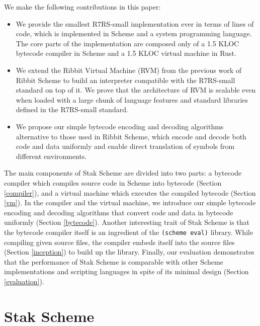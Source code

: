 \documentclass[sigplan, anonymous, review]{acmart}
\begin{document}
We make the following contributions in this paper:

\begin{itemize}
  \item We provide the smallest R7RS-small implementation ever in
    terms of lines of code, which is implemented
    in Scheme and a system programming language.
    The core parts of the implementation are composed only of a 1.5
    KLOC bytecode
    compiler in Scheme and a 1.5 KLOC virtual machine in Rust.
  \item We extend the Ribbit Virtual Machine (RVM) from the previous
    work of Ribbit Scheme to build an interpreter compatible with the
    R7RS-small standard on top of it.
    We prove that the architecture of RVM is scalable even when
    loaded with a large chunk of language features and standard
    libraries defined in the R7RS-small standard.
  \item We propose our simple bytecode encoding and decoding algorithms
    alternative to those used in Ribbit Scheme, which encode and
    decode both code and data uniformly and enable direct translation
    of symbols from different environments.
\end{itemize}

The main components of Stak Scheme are divided into two parts:
a bytecode compiler which compiles source code in Scheme into
bytecode (Section \ref{compiler}),
and a virtual machine which executes the compiled bytecode
(Section \ref{vm}).
In the compiler and the virtual machine, we introduce our simple
bytecode encoding and
decoding algorithms that convert code and data in bytecode
uniformly (Section \ref{bytecode}).
Another interesting trait of Stak Scheme is that the bytecode compiler itself
is an ingredient of the \texttt{(scheme eval)} library.
While compiling given source files, the compiler embeds itself
into the source files (Section \ref{inception}) to build up the library.
Finally, our evaluation demonstrates that the performance of Stak Scheme is
comparable with other Scheme implementations and scripting
languages in spite of its minimal design (Section \ref{evaluation}).

\section{Stak Scheme}
\end{document}
